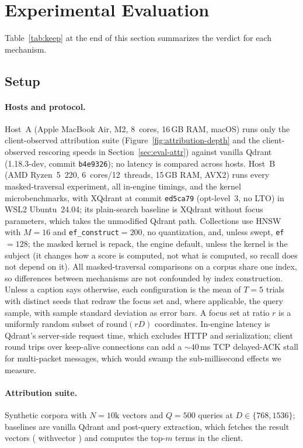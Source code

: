\documentclass[sigconf,review,balance=false]{acmart}
\newcommand{\breakablecode}[1]{%
  {\ttfamily
    \renewcommand{\_}{\textunderscore\allowbreak}%
    #1%
  }}
\begin{document}
\section{Experimental Evaluation}
\label{sec:eval}

Table~\ref{tab:keep} at the end of this section summarizes the verdict for
each mechanism.

\subsection{Setup}

\paragraph{Hosts and protocol.} Host~A (Apple MacBook Air, M2, 8~cores,
16\,GB RAM, macOS) runs only the client-observed attribution suite
(Figure~\ref{fig:attribution-depth} and the client-observed rescoring speeds
in Section~\ref{sec:eval-attr}) against vanilla Qdrant (1.18.3-dev, commit \texttt{b4e9326}); no latency is compared
across hosts. Host~B (AMD Ryzen~5~220, 6~cores/12~threads, 15\,GB
RAM, AVX2) runs every masked-traversal experiment, all in-engine timings, and
the kernel microbenchmarks, with XQdrant at commit \texttt{ed5ca79}
(opt-level~3, no LTO) in WSL2 Ubuntu~24.04; its plain-search baseline is
XQdrant without focus parameters, which takes the unmodified Qdrant path. Collections use HNSW with
$M{=}16$ and \texttt{ef\_construct}${=}200$, no quantization, and, unless
swept, \texttt{ef}${=}128$; the masked kernel is repack, the engine default,
unless the kernel is the subject (it changes how a score is computed, not what
is computed, so recall does not depend on it). All masked-traversal comparisons on a corpus share one index, so
differences between mechanisms are not confounded by index construction.
Unless a caption says otherwise, each configuration is the mean of $T{=}5$
trials with distinct seeds that redraw the focus set and, where applicable,
the query sample, with sample standard deviation as error bars. A focus set at
ratio $r$ is a uniformly random subset of $\mathrm{round}(rD)$ coordinates.
In-engine latency is Qdrant's server-side request time, which excludes HTTP
and serialization; client round trips over keep-alive connections can add a
${\sim}40$\,ms TCP delayed-ACK stall for multi-packet messages, which would
swamp the sub-millisecond effects we measure.

\paragraph{Attribution suite.} Synthetic corpora with $N{=}10\mathrm{k}$
vectors and $Q{=}500$ queries at $D\in\{768,1536\}$; baselines are vanilla
Qdrant and post-query extraction, which fetches the result vectors
(\breakablecode{with\_vector}) and computes the top-$m$ terms in the client.
\end{document}
